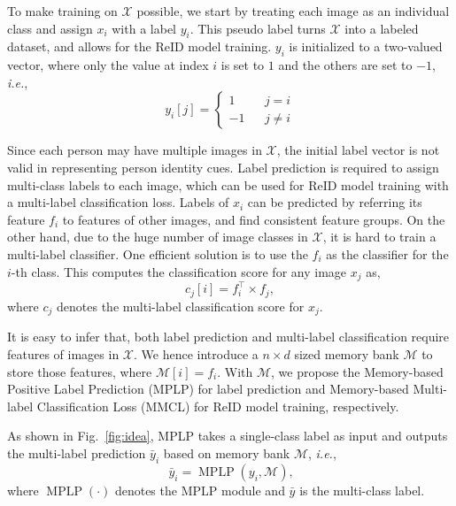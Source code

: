 \documentclass[10pt,twocolumn,letterpaper]{article}
\begin{document}
To make training on $\mathcal X$ possible, we start by treating each image as an individual class and assign $x_i$ with a label $y_i$. This pseudo label turns $\mathcal X$ into a labeled dataset, and allows for the ReID model training. $y_i$ is initialized to a two-valued vector, where only the value at index $i$ is set to $1$ and the others are set to $-1$, \emph{i.e.},
\begin{equation}
y_i[j]=\left\{
\begin{array}{rcl}
1 & & {j = i}\\
-1 & & {j \neq i}
\end{array} \right.
\end{equation}


Since each person may have multiple images in $\mathcal X$, the initial label vector is not valid in representing person identity cues. Label prediction is required to assign multi-class labels to each image, which can be used for ReID model training with a multi-label classification loss. Labels of $x_i$ can be predicted by referring its feature $f_i$ to features of other images, and find consistent feature groups. On the other hand, due to the huge number of image classes in $\mathcal X$, it is hard to train a multi-label classifier. One efficient solution is to use the $f_i$ as the classifier for the $i$-th class. This computes the classification score for any image $x_j$ as,
\begin{equation}
c_j[i]= f_i^\top \times f_j,
\end{equation}
where $c_j$ denotes the multi-label classification score for $x_j$.

It is easy to infer that, both label prediction and multi-label classification require features of images in $\mathcal X$. We hence introduce a $n \times d$ sized memory bank $\mathcal{M}$ to store those features, where $\mathcal{M}[i] =f_i$. With $\mathcal{M}$, we propose the Memory-based Positive Label Prediction
(MPLP) for label prediction and Memory-based Multi-label Classification Loss (MMCL) for ReID model training, respectively.

As shown in Fig.~\ref{fig:idea}, MPLP takes a single-class label as input and outputs the multi-label prediction $\bar y_i$ based on memory bank $\mathcal{M}$, \emph{i.e.},
\begin{equation}~\label{eq:mplp}
\bar y_i = \operatorname {MPLP}(y_i, \mathcal{M}),
\end{equation}
where $\operatorname {MPLP}(\cdot)$ denotes the MPLP module and $\bar y$ is the multi-class label.
\end{document}
